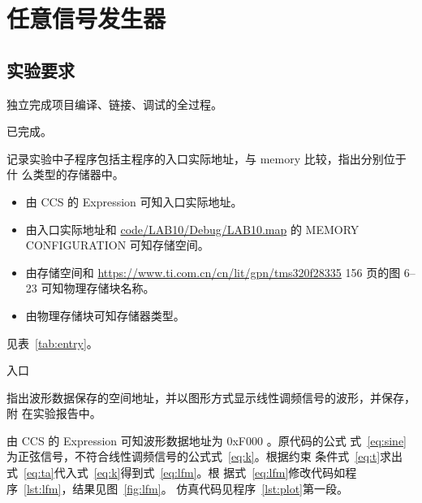 \documentclass[../main]{subfiles}
\begin{document}
\chapter{任意信号发生器}%
\label{cha:ramgen}

\section{实验要求}%
\label{sec:\arabic{chapter}requirement}

\begin{Exercise}
  独立完成项目编译、链接、调试的全过程。
\end{Exercise}

\begin{Answer}
  已完成。
\end{Answer}

\begin{Exercise}
  记录实验中子程序包括主程序的入口实际地址，与 memory 比较，指出分别位于什
  么类型的存储器中。
\end{Exercise}

\begin{Answer}
  \begin{itemize}
    \item 由 CCS 的 Expression 可知入口实际地址。
    \item 由入口实际地址和 \url{code/LAB10/Debug/LAB10.map} 的 MEMORY
      CONFIGURATION 可知存储空间。
    \item 由存储空间和 \url{https://www.ti.com.cn/cn/lit/gpn/tms320f28335}
      156 页的图 6--23 可知物理存储块名称。
    \item 由物理存储块可知存储器类型。
  \end{itemize}
  见表~\ref{tab:entry}。
\end{Answer}

\begin{table}[htbp]
  \centering
  \caption{入口}%
  \label{tab:entry}
\end{table}

\begin{Exercise}
  指出波形数据保存的空间地址，并以图形方式显示线性调频信号的波形，并保存，附
  在实验报告中。
\end{Exercise}

\begin{Answer}
  由 CCS 的 Expression 可知波形数据地址为 0xF000 。原代码的公式
  式~\ref{eq:sine}为正弦信号，不符合线性调频信号的公式式~\ref{eq:k}。根据约束
  条件式~\ref{eq:t}求出式~\ref{eq:ta}代入式~\ref{eq:k}得到式~\ref{eq:lfm}。根
  据式~\ref{eq:lfm}修改代码如程序~\ref{lst:lfm}，结果见图~\ref{fig:lfm}。
  仿真代码见程序~\ref{lst:plot}第一段。
\end{Answer}
\end{document}

